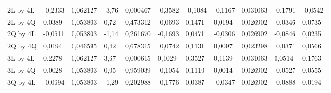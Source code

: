 \begin{table}[H]
{\begin{tabular}{lllllllllll}
\rowcolor[HTML]{FFFFFF} 
2L by 4L       & {\color[HTML]{FF0000} -0,2333}  & {\color[HTML]{FF0000} 0,062127} & {\color[HTML]{FF0000} -3,76}    & {\color[HTML]{FF0000} 0,000467} & {\color[HTML]{FF0000} -0,3582}  & {\color[HTML]{FF0000} -0,1084}  & {\color[HTML]{FF0000} -0,1167}  & {\color[HTML]{FF0000} 0,031063} & {\color[HTML]{FF0000} -0,1791}  & {\color[HTML]{FF0000} -0,0542}  \\
\rowcolor[HTML]{FFFFFF} 
2L by 4Q       & {\color[HTML]{333333} 0,0389}   & {\color[HTML]{333333} 0,053803} & {\color[HTML]{333333} 0,72}     & {\color[HTML]{333333} 0,473312} & {\color[HTML]{333333} -0,0693}  & {\color[HTML]{333333} 0,1471}   & {\color[HTML]{333333} 0,0194}   & {\color[HTML]{333333} 0,026902} & {\color[HTML]{333333} -0,0346}  & {\color[HTML]{333333} 0,0735}   \\
\rowcolor[HTML]{FFFFFF} 
2Q by 4L       & {\color[HTML]{333333} -0,0611}  & {\color[HTML]{333333} 0,053803} & {\color[HTML]{333333} -1,14}    & {\color[HTML]{333333} 0,261670} & {\color[HTML]{333333} -0,1693}  & {\color[HTML]{333333} 0,0471}   & {\color[HTML]{333333} -0,0306}  & {\color[HTML]{333333} 0,026902} & {\color[HTML]{333333} -0,0846}  & {\color[HTML]{333333} 0,0235}   \\
\rowcolor[HTML]{FFFFFF} 
2Q by 4Q       & {\color[HTML]{333333} 0,0194}   & {\color[HTML]{333333} 0,046595} & {\color[HTML]{333333} 0,42}     & {\color[HTML]{333333} 0,678315} & {\color[HTML]{333333} -0,0742}  & {\color[HTML]{333333} 0,1131}   & {\color[HTML]{333333} 0,0097}   & {\color[HTML]{333333} 0,023298} & {\color[HTML]{333333} -0,0371}  & {\color[HTML]{333333} 0,0566}   \\
\rowcolor[HTML]{FFFFFF} 
3L by 4L       & {\color[HTML]{FF0000} 0,2278}   & {\color[HTML]{FF0000} 0,062127} & {\color[HTML]{FF0000} 3,67}     & {\color[HTML]{FF0000} 0,000615} & {\color[HTML]{FF0000} 0,1029}   & {\color[HTML]{FF0000} 0,3527}   & {\color[HTML]{FF0000} 0,1139}   & {\color[HTML]{FF0000} 0,031063} & {\color[HTML]{FF0000} 0,0514}   & {\color[HTML]{FF0000} 0,1763}   \\
\rowcolor[HTML]{FFFFFF} 
3L by 4Q       & {\color[HTML]{333333} 0,0028}   & {\color[HTML]{333333} 0,053803} & {\color[HTML]{333333} 0,05}     & {\color[HTML]{333333} 0,959039} & {\color[HTML]{333333} -0,1054}  & {\color[HTML]{333333} 0,1110}   & {\color[HTML]{333333} 0,0014}   & {\color[HTML]{333333} 0,026902} & {\color[HTML]{333333} -0,0527}  & {\color[HTML]{333333} 0,0555}   \\
\rowcolor[HTML]{FFFFFF} 
3Q by 4L       & {\color[HTML]{333333} -0,0694}  & {\color[HTML]{333333} 0,053803} & {\color[HTML]{333333} -1,29}    & {\color[HTML]{333333} 0,202988} & {\color[HTML]{333333} -0,1776}  & {\color[HTML]{333333} 0,0387}   & {\color[HTML]{333333} -0,0347}  & {\color[HTML]{333333} 0,026902} & {\color[HTML]{333333} -0,0888}  & {\color[HTML]{333333} 0,0194}   \\

\end{tabular}}
\end{table}
